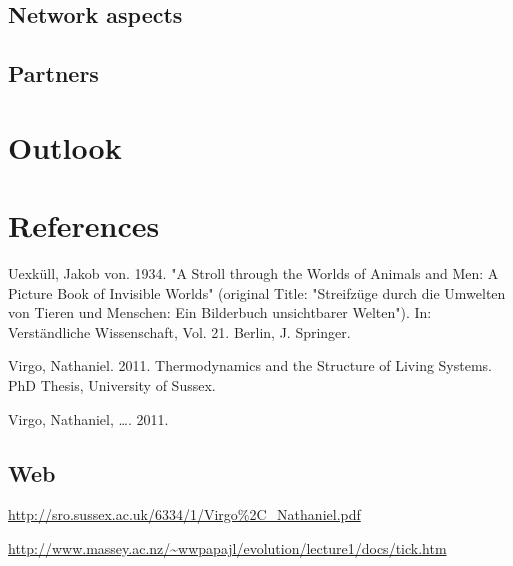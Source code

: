 \documentclass[11pt]{article}
\begin{document}
\subsection{Network aspects}
\label{sec:orga006ce5}

\subsection{Partners}
\label{sec:org06b39ad}

\section{Outlook}
\label{sec:orge52c774}

\section{References}
\label{sec:org94ed9b4}



Uexküll, Jakob von. 1934.  "A Stroll through the Worlds of Animals and Men: A Picture Book of Invisible Worlds" (original Title: "Streifzüge durch die Umwelten von Tieren und Menschen: Ein Bilderbuch unsichtbarer Welten"). In: Verständliche Wissenschaft, Vol. 21. Berlin, J. Springer.

Virgo, Nathaniel. 2011. Thermodynamics and the Structure of Living Systems. PhD Thesis, University of Sussex.

Virgo, Nathaniel, \ldots{}. 2011. 


\subsection{Web}
\label{sec:org08b9ed3}
\url{http://sro.sussex.ac.uk/6334/1/Virgo\%2C\_Nathaniel.pdf}


\url{http://www.massey.ac.nz/\~wwpapajl/evolution/lecture1/docs/tick.htm}
\end{document}
